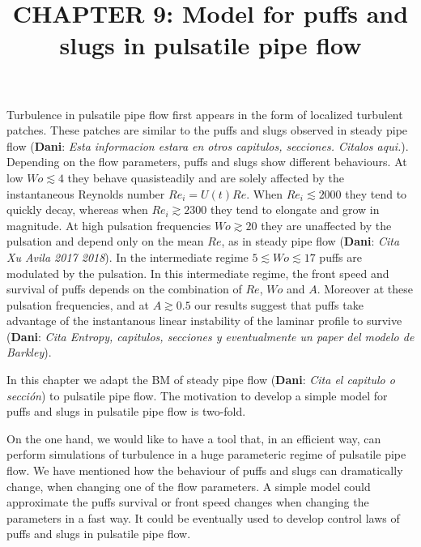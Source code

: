 \documentclass{article}
\title{CHAPTER 9: Model for puffs and slugs in pulsatile pipe flow}
\date{}
\DeclareRobustCommand{\dm}[1]{{\color{blue}(\textbf{Dani}: \textit{#1}\xspace)}}
\begin{document}
\maketitle
Turbulence in pulsatile pipe flow first appears in the form of localized turbulent patches. These patches are similar to the puffs and slugs observed in steady pipe flow \dm{Esta informacion estara en otros capitulos, secciones. Citalos aqui.}. Depending on the flow parameters, puffs and slugs show different behaviours. At low $Wo \lesssim 4$ they behave quasisteadily and are solely affected by the instantaneous Reynolds number $Re_{i}= U\left( t \right) Re$. When $Re_{i} \lesssim 2000$ they tend to quickly decay, whereas when $Re_{i} \gtrsim 2300$ they tend to elongate and grow in magnitude. At high pulsation frequencies $Wo \gtrsim 20$ they are unaffected by the pulsation and depend only on the mean $Re$, as in steady pipe flow \dm{Cita Xu Avila 2017 2018}. In the intermediate regime $5 \lesssim Wo \lesssim 17$ puffs are modulated by the pulsation. In this intermediate regime, the front speed and survival of puffs depends on the combination of $Re$, $Wo$ and $A$. Moreover at these pulsation frequencies, and at $A\gtrsim 0.5$ our results suggest that puffs take advantage of the instantanous linear instability of the laminar profile to survive \dm{Cita Entropy, capitulos, secciones y eventualmente un paper del modelo de Barkley}.

In this chapter we adapt the BM of steady pipe flow \dm{Cita el capitulo o sección} to pulsatile pipe flow. The motivation to develop a simple model for puffs and slugs in pulsatile pipe flow is two-fold.

On the one hand, we would like to have a tool that, in an efficient way, can perform simulations of turbulence in a huge parameteric regime of pulsatile pipe flow. We have mentioned how the behaviour of puffs and slugs can dramatically change, when changing one of the flow parameters. A simple model could approximate the puffs survival or front speed changes when changing the parameters in a fast way. It could be eventually used to develop control laws of puffs and slugs in pulsatile pipe flow.
\end{document}
